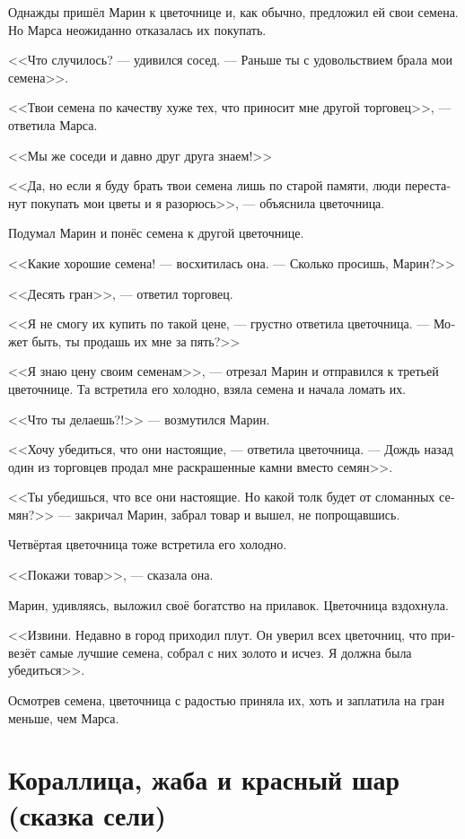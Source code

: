 \documentclass[a4paper,12pt,fleqn]{book}\usepackage{polyglossia}\setdefaultlanguage[babelshorthands=true]{russian}\setotherlanguage{english}\defaultfontfeatures{Ligatures=TeX,Mapping=tex-text}\usepackage{xcolor}\newcommand{\ml}[3]{#2}
\begin{document}
{Однажды пришёл Марин к цветочнице и, как обычно, предложил ей свои семена.
Но Марса неожиданно отказалась их покупать.

<<Что случилось? --- удивился сосед.
--- Раньше ты с удовольствием брала мои семена>>.

<<Твои семена по качеству хуже тех, что приносит мне другой торговец>>, --- ответила Марса.

<<Мы же соседи и давно друг друга знаем!>>

<<Да, но если я буду брать твои семена лишь по старой памяти, люди перестанут покупать мои цветы и я разорюсь>>, --- объяснила цветочница.

Подумал Марин и понёс семена к другой цветочнице.

<<Какие хорошие семена! --- восхитилась она.
--- Сколько просишь, Марин?>>

<<Десять гран>>, --- ответил торговец.

<<Я не смогу их купить по такой цене, --- грустно ответила цветочница.
--- Может быть, ты продашь их мне за пять?>>

<<Я знаю цену своим семенам>>, --- отрезал Марин и отправился к третьей цветочнице.
Та встретила его холодно, взяла семена и начала ломать их.

<<Что ты делаешь?!>> --- возмутился Марин.

<<Хочу убедиться, что они настоящие, --- ответила цветочница.
--- Дождь назад один из торговцев продал мне раскрашенные камни вместо семян>>.

<<Ты убедишься, что все они настоящие.
Но какой толк будет от сломанных семян?>> --- закричал Марин, забрал товар и вышел, не попрощавшись.

Четвёртая цветочница тоже встретила его холодно.

<<Покажи товар>>, --- сказала она.

Марин, удивляясь, выложил своё богатство на прилавок.
Цветочница вздохнула.

<<Извини.
Недавно в город приходил плут.
Он уверил всех цветочниц, что привезёт самые лучшие семена, собрал с них золото и исчез.
Я должна была убедиться>>.

Осмотрев семена, цветочница с радостью приняла их, хоть и заплатила на гран меньше, чем Марса.

\section{Кораллица, жаба и красный шар (сказка сели)}

}
\end{document}
